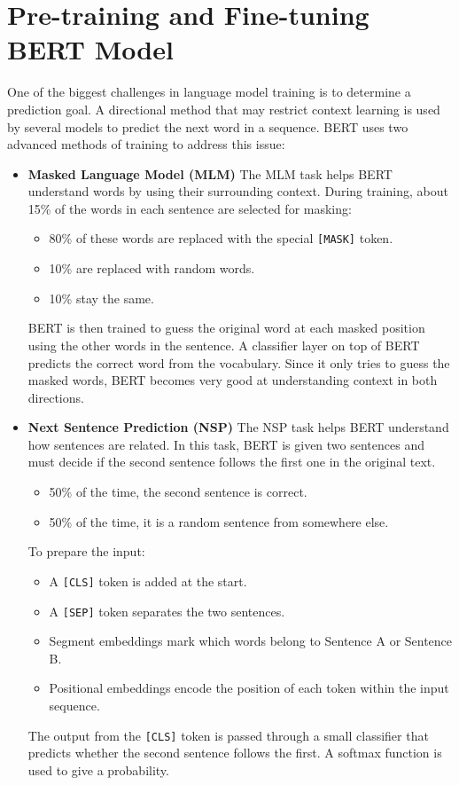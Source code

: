 \section{Pre-training and Fine-tuning BERT Model}
One of the biggest challenges in language model training is to determine a prediction goal. A directional method that may restrict context learning is used by several models to predict the next word in a sequence. BERT uses two advanced methods of training to address this issue:
\begin{itemize}
    \item \textbf{Masked Language Model (MLM)}  
    The MLM task helps BERT understand words by using their surrounding context. During training, about 15\% of the words in each sentence are selected for masking:
    \begin{itemize}
        \item 80\% of these words are replaced with the special \texttt{[MASK]} token.
        \item 10\% are replaced with random words.
        \item 10\% stay the same.
    \end{itemize}
    BERT is then trained to guess the original word at each masked position using the other words in the sentence. A classifier layer on top of BERT predicts the correct word from the vocabulary. Since it only tries to guess the masked words, BERT becomes very good at understanding context in both directions.
    
    \item \textbf{Next Sentence Prediction (NSP)}  
    The NSP task helps BERT understand how sentences are related. In this task, BERT is given two sentences and must decide if the second sentence follows the first one in the original text. 
    \begin{itemize}
        \item 50\% of the time, the second sentence is correct.
        \item 50\% of the time, it is a random sentence from somewhere else.
    \end{itemize}
    To prepare the input:
    \begin{itemize}
        \item A \texttt{[CLS]} token is added at the start.
        \item A \texttt{[SEP]} token separates the two sentences.
        \item Segment embeddings mark which words belong to Sentence A or Sentence B.
        \item Positional embeddings encode the position of each token within the input sequence.

    \end{itemize}
    The output from the \texttt{[CLS]} token is passed through a small classifier that predicts whether the second sentence follows the first. A softmax function is used to give a probability.
\end{itemize}

